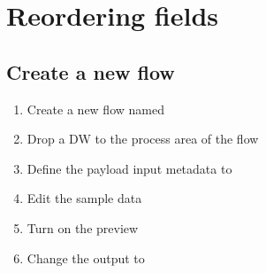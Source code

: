 
\section{Reordering fields}

\subsection{Create a new flow}
\begin{enumerate}
\item Create a new flow named 
\item Drop a DW to the process area of the flow
\item Define the payload input metadata to 
\item Edit the sample data
\item Turn on the preview
\item Change the output to 
\end{enumerate}

